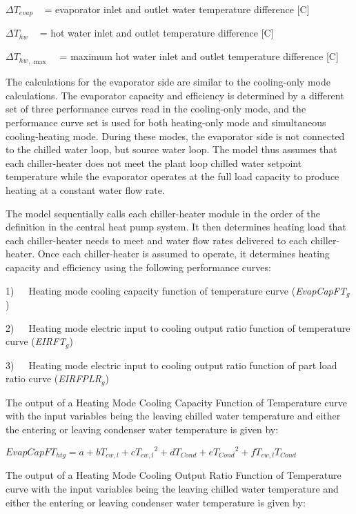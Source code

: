 \(\Delta {T_{evap}}\) ~ = evaporator inlet and outlet water temperature difference {[}C{]}

\(\Delta {T_{hw}}\) ~ = hot water inlet and outlet temperature difference {[}C{]}

\(\Delta {T_{hw}}_{,\max }\) ~ = maximum hot water inlet and outlet temperature difference {[}C{]}

The calculations for the evaporator side are similar to the cooling-only mode calculations. The evaporator capacity and efficiency is determined by a different set of three performance curves read in the cooling-only mode, and the performance curve set is used for both heating-only mode and simultaneous cooling-heating mode. During these modes, the evaporator side is not connected to the chilled water loop, but source water loop. The model thus assumes that each chiller-heater does not meet the plant loop chilled water setpoint temperature while the evaporator operates at the full load capacity to produce heating at a constant water flow rate.

The model sequentially calls each chiller-heater module in the order of the definition in the central heat pump system. It then determines heating load that each chiller-heater needs to meet and water flow rates delivered to each chiller-heater. Once each chiller-heater is assumed to operate, it determines heating capacity and efficiency using the following performance curves:

1)~~~Heating mode cooling capacity function of temperature curve (\emph{EvapCapFT\(_{g}\)})

2)~~~Heating mode electric input to cooling output ratio function of temperature curve (\emph{EIRFT\(_{g}\)})

3)~~~Heating mode electric input to cooling output ratio function of part load ratio curve (\emph{EIRFPLR\(_{g}\)})

The output of a Heating Mode Cooling Capacity Function of Temperature curve with the input variables being the leaving chilled water temperature and either the entering or leaving condenser water temperature is given by:

\textbf{\emph{\(EvapCapF{T_{htg}} = a + b{T_{cw,l}} + c{T_{cw,l}}^2 + d{T_{Cond}} + e{T_{Cond}}^2 + f{T_{cw,l}}{T_{Cond}}\)}}

The output of a Heating Mode Cooling Output Ratio Function of Temperature curve with the input variables being the leaving chilled water temperature and either the entering or leaving condenser water temperature is given by:


